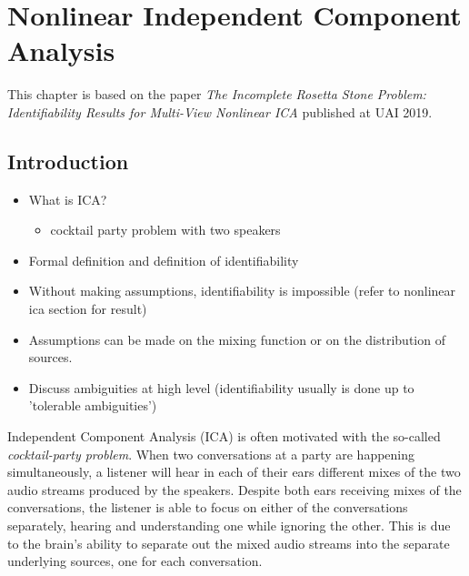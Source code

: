 \chapter{Nonlinear Independent Component Analysis}

\ifpdf
    \graphicspath{{Chapter4/Figs/Raster/}{Chapter4/Figs/PDF/}{Chapter4/Figs/}}
\else
    \graphicspath{{Chapter4/Figs/Vector/}{Chapter4/Figs/}}
\fi

This chapter is based on the paper \emph{The Incomplete Rosetta Stone Problem: Identifiability Results for Multi-View Nonlinear ICA} published at UAI 2019.


\section{Introduction}

\begin{itemize}
	\item What is ICA?
	\begin{itemize}
		\item cocktail party problem with two speakers
	\end{itemize}
	\item Formal definition and definition of identifiability
	\item Without making assumptions, identifiability is impossible (refer to nonlinear ica section for result)
	\item Assumptions can be made on the mixing function or on the distribution of sources.
	\item Discuss ambiguities at high level (identifiability usually is done up to 'tolerable ambiguities')
\end{itemize}

Independent Component Analysis (ICA) is often motivated with the so-called \emph{cocktail-party problem}.
When two conversations at a party are happening simultaneously, a listener will hear in each of their ears different mixes of the two audio streams produced by the speakers.
Despite both ears receiving mixes of the conversations, the listener is able to focus on either of the conversations separately, hearing and understanding one while ignoring the other.
This is due to the brain's ability to separate out the mixed audio streams into the separate underlying sources, one for each conversation.

